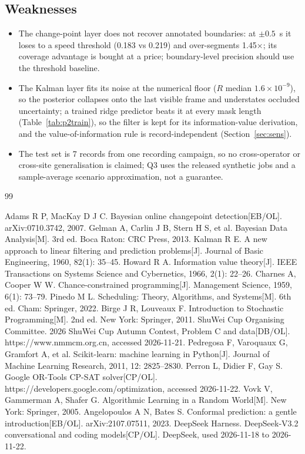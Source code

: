 \documentclass{swmcmthesis}
\begin{document}
\subsection{Weaknesses}
\begin{itemize}
  \item The change-point layer does not recover annotated boundaries: at $\pm0.5$~s it loses to a speed threshold (0.183 vs 0.219) and over-segments 1.45$\times$; its coverage advantage is bought at a price; boundary-level precision should use the threshold baseline.
  \item The Kalman layer fits its noise at the numerical floor ($R$ median $1.6\times10^{-9}$), so the posterior collapses onto the last visible frame and understates occluded uncertainty; a trained ridge predictor beats it at every mask length (Table~\ref{tab:p2train}), so the filter is kept for its information-value derivation, and the value-of-information rule is record-independent (Section~\ref{sec:sens}).
  \item The test set is 7 records from one recording campaign, so no cross-operator or cross-site generalisation is claimed; Q3 uses the released synthetic jobs and a sample-average scenario approximation, not a guarantee.
\end{itemize}

\begin{thebibliography}{99}\footnotesize\raggedright\setlength{\itemsep}{0pt}\setlength{\parsep}{0pt}\setlength{\baselineskip}{9.0pt}
 Adams R P, MacKay D J C. Bayesian online changepoint detection[EB/OL]. arXiv:0710.3742, 2007.
 Gelman A, Carlin J B, Stern H S, et al. Bayesian Data Analysis[M]. 3rd ed. Boca Raton: CRC Press, 2013.
 Kalman R E. A new approach to linear filtering and prediction problems[J]. Journal of Basic Engineering, 1960, 82(1): 35--45.
 Howard R A. Information value theory[J]. IEEE Transactions on Systems Science and Cybernetics, 1966, 2(1): 22--26.
 Charnes A, Cooper W W. Chance-constrained programming[J]. Management Science, 1959, 6(1): 73--79.
 Pinedo M L. Scheduling: Theory, Algorithms, and Systems[M]. 6th ed. Cham: Springer, 2022.
 Birge J R, Louveaux F. Introduction to Stochastic Programming[M]. 2nd ed. New York: Springer, 2011.
 ShuWei Cup Organising Committee. 2026 ShuWei Cup Autumn Contest, Problem C and data[DB/OL]. https://www.nmmcm.org.cn, accessed 2026-11-21.
 Pedregosa F, Varoquaux G, Gramfort A, et al. Scikit-learn: machine learning in Python[J]. Journal of Machine Learning Research, 2011, 12: 2825--2830.
 Perron L, Didier F, Gay S. Google OR-Tools CP-SAT solver[CP/OL]. https://developers.google.com/optimization, accessed 2026-11-22.
 Vovk V, Gammerman A, Shafer G. Algorithmic Learning in a Random World[M]. New York: Springer, 2005.
 Angelopoulos A N, Bates S. Conformal prediction: a gentle introduction[EB/OL]. arXiv:2107.07511, 2023.
 DeepSeek Harness. DeepSeek-V3.2 conversational and coding models[CP/OL]. DeepSeek, used 2026-11-18 to 2026-11-22.
\end{thebibliography}
\end{document}
